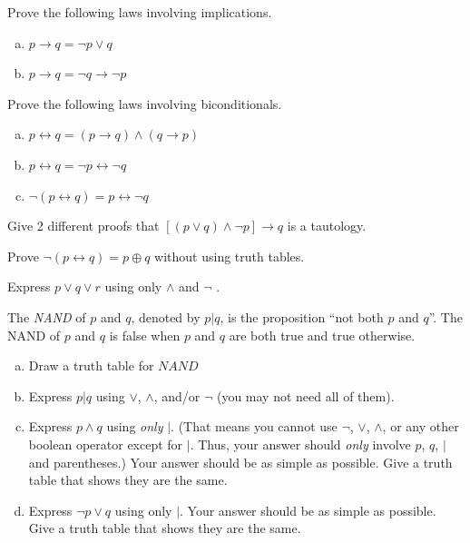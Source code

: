 \begin{pro}
Prove the following laws involving implications.
\begin{enumerate}[(a)]
\item
$p\rightarrow q = \neg p \vee q$
\item
$p\rightarrow q = \neg q \rightarrow \neg p$
\end{enumerate}
\end{pro}

\begin{pro}
Prove the following laws involving biconditionals.
\begin{enumerate}[(a)]
\item
$p\leftrightarrow q = (p\rightarrow q)\wedge (q\rightarrow p)$
\item
$p\leftrightarrow q = \neg p\leftrightarrow \neg q$
\item
$\neg(p\leftrightarrow q) = p\leftrightarrow\neg q$
\end{enumerate}
\end{pro}

\begin{pro}
Give 2 different proofs that $[(p\vee q)\wedge \neg p] \rightarrow q$ 
is a tautology. 
\end{pro}

\begin{pro}
Prove $\neg(p\leftrightarrow q) = p\oplus q$ without using truth tables.
\end{pro}

\begin{pro}
Express $p\vee q \vee r$ using only $\wedge$ and $\neg$ .
\end{pro}

\begin{pro}
 The {\em NAND} of $p$ and $q$, denoted by $p | q$, is the proposition ``not both $p$ and $q$''. 
The NAND of $p$ and $q$ is false when $p$ and $q$ are both true and true otherwise.
\begin{enumerate}[(a)]
\item Draw a truth table for $NAND$
\item Express $p|q$ using $\vee$, $\wedge$, and/or $\neg$ (you may not need all of them).
\item Express $p\wedge q$ using {\em only} $|$. 
(That means you cannot use $\neg$, $\vee$, $\wedge$, or any other
boolean operator except for $|$. Thus, your answer should {\em only} involve $p$, $q$, $|$ and parentheses.)
Your answer should be as simple as possible. Give a truth table that shows they are the same.
\item Express $\neg p\vee q$ using only $|$.  Your answer should be as simple as possible. Give a truth table that shows they are the same.
\end{enumerate}
\end{pro}

